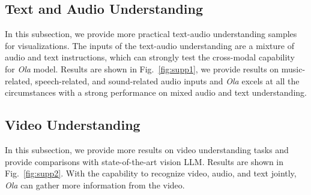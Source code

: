 \subsection{Text and Audio Understanding}

In this subsection, we provide more practical text-audio understanding samples for visualizations. The inputs of the text-audio understanding are a mixture of audio and text instructions, which can strongly test the cross-modal capability for \textit{Ola} model. Results are shown in Fig.~\ref{fig:supp1}, we provide results on music-related, speech-related, and sound-related audio inputs and \textit{Ola} excels at all the circumstances with a strong performance on mixed audio and text understanding. 

\subsection{Video Understanding}

In this subsection, we provide more results on video understanding tasks and provide comparisons with state-of-the-art vision LLM. Results are shown in Fig.~\ref{fig:supp2}. With the capability to recognize video, audio, and text jointly, \textit{Ola} can gather more information from the video. 

